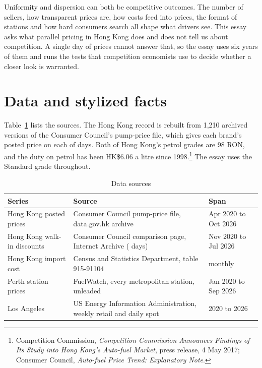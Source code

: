 \documentclass[11pt]{article}
\newcommand{\hk}{HK\$}
\begin{document}
Uniformity and dispersion can both be competitive outcomes. The number of sellers, how transparent prices are, how costs feed into prices, the format of stations and how hard consumers search all shape what drivers see. This essay asks what parallel pricing in Hong Kong does and does not tell us about competition. A single day of prices cannot answer that, so the essay uses six years of them and runs the tests that competition economists use to decide whether a closer look is warranted.

\section{Data and stylized facts}

Table~\ref{tab:data} lists the sources. The Hong Kong record is rebuilt from 1,210 archived versions of the Consumer Council's pump-price file, which gives each brand's posted price on each of \hkDays{} days. Both of Hong Kong's petrol grades are 98 RON, and the duty on petrol has been \hk6.06 a litre since 1998.\footnote{Competition Commission, \emph{Competition Commission Announces Findings of Its Study into Hong Kong's Auto-fuel Market}, press release, 4 May 2017\label{fn:cc}; Consumer Council, \emph{Auto-fuel Price Trend: Explanatory Note}.} The essay uses the Standard grade throughout.

\begin{table}[H]
\centering\small
\caption{Data sources}
\label{tab:data}
\begin{tabularx}{\textwidth}{@{}lXl@{}}
\toprule
Series & Source & Span \\
\midrule
Hong Kong posted prices & Consumer Council pump-price file, data.gov.hk archive & Apr 2020 to Oct 2026 \\
Hong Kong walk-in discounts & Consumer Council comparison page, Internet Archive (\discDays{} days) & Nov 2020 to Jul 2026 \\
Hong Kong import cost & Census and Statistics Department, table 915-91104 & monthly \\
Perth station prices & FuelWatch, every metropolitan station, unleaded & Jan 2020 to Sep 2026 \\
Los Angeles & US Energy Information Administration, weekly retail and daily spot & 2020 to 2026 \\
\bottomrule
\end{tabularx}
\end{table}
\end{document}
